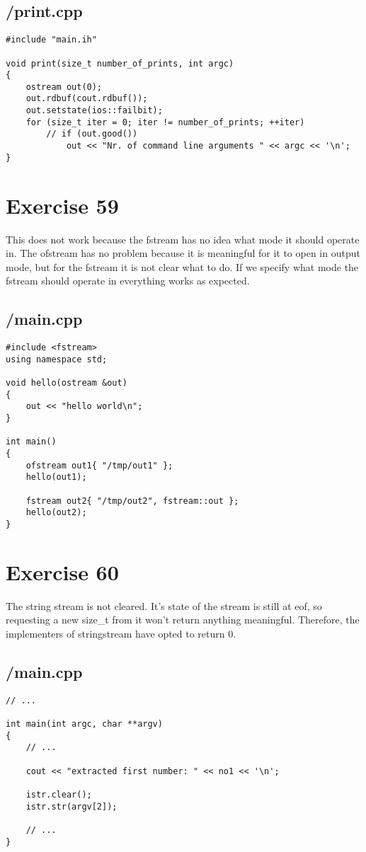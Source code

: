 \documentclass{article}
\begin{document}
\subsection*{/print.cpp}
\begin{verbatim}
#include "main.ih"

void print(size_t number_of_prints, int argc)
{
    ostream out(0);
    out.rdbuf(cout.rdbuf());
    out.setstate(ios::failbit);
    for (size_t iter = 0; iter != number_of_prints; ++iter)
        // if (out.good())
            out << "Nr. of command line arguments " << argc << '\n';
}
\end{verbatim}

\section*{Exercise 59}
This does not work because the fstream has no idea what mode it should operate in. The ofstream has no problem because it is meaningful for it to open in output mode, but for the fstream it is not clear what to do. If we specify what mode the fstream should operate in everything works as expected.
\subsection*{/main.cpp}
\begin{verbatim}
#include <fstream>
using namespace std;

void hello(ostream &out)
{
    out << "hello world\n";
}

int main()
{
    ofstream out1{ "/tmp/out1" };
    hello(out1);

    fstream out2{ "/tmp/out2", fstream::out };
    hello(out2);
}

\end{verbatim}

\section*{Exercise 60}
The string stream is not cleared. It's state of the stream is still at eof, so requesting a new size_t from it won't return anything meaningful. Therefore, the implementers of stringstream have opted to return 0.
\subsection*{/main.cpp}
\begin{verbatim}
// ...

int main(int argc, char **argv)
{
    // ...
  
    cout << "extracted first number: " << no1 << '\n';

    istr.clear();
    istr.str(argv[2]);
    
    // ...
}

\end{verbatim}
\end{document}
